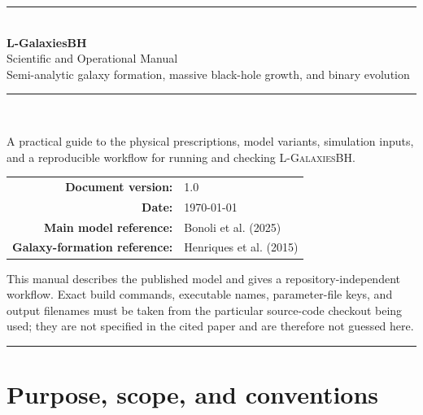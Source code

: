 \documentclass[11pt,a4paper]{article}
\newcommand{\Lgalbh}{\textsc{L-GalaxiesBH}}
\begin{document}
\begin{titlepage}
  \centering
  \vspace*{1.4cm}
  {\color{accent}\rule{\linewidth}{1.4pt}}\\[1.0cm]
  {\Huge\bfseries\color{accent} L-GalaxiesBH}\\[0.35cm]
  {\LARGE Scientific and Operational Manual}\\[0.8cm]
  {\large Semi-analytic galaxy formation, massive black-hole growth, and binary evolution}\\[1.0cm]
  {\color{accent}\rule{0.72\linewidth}{0.8pt}}\\[1.1cm]
  \begin{minipage}{0.82\textwidth}
    \centering
    \large
    A practical guide to the physical prescriptions, model variants, simulation inputs, and a reproducible workflow for running and checking \Lgalbh.
  \end{minipage}
  \vfill
  \begin{tabular}{rl}
    \textbf{Document version:} & 1.0 \\
    \textbf{Date:} & \today \\
    \textbf{Main model reference:} & Bonoli et al. (2025) \\
    \textbf{Galaxy-formation reference:} & Henriques et al. (2015)
  \end{tabular}
  \vspace{0.7cm}
  \begin{minipage}{0.9\textwidth}
    \tiny\color{codegray}
    This manual describes the published model and gives a repository-independent workflow. Exact build commands, executable names, parameter-file keys, and output filenames must be taken from the particular source-code checkout being used; they are not specified in the cited paper and are therefore not guessed here.
  \end{minipage}
  \vspace{0.7cm}
  {\color{accent}\rule{\linewidth}{1.4pt}}
\end{titlepage}

\tableofcontents
\clearpage
{}

\section{Purpose, scope, and conventions}
\end{document}
